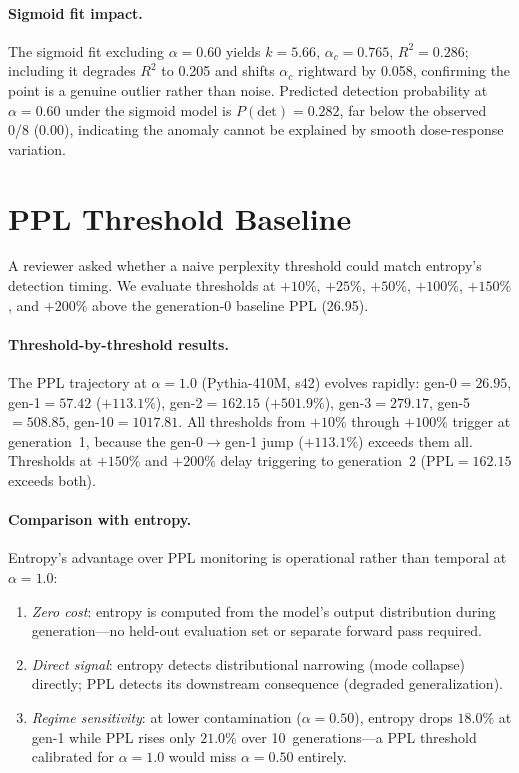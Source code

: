 \paragraph{Sigmoid fit impact.}
The sigmoid fit excluding $\alpha{=}0.60$ yields $k{=}5.66$, $\alpha_c{=}0.765$, $R^2{=}0.286$; including it degrades $R^2$ to 0.205 and shifts $\alpha_c$ rightward by 0.058, confirming the point is a genuine outlier rather than noise.
Predicted detection probability at $\alpha{=}0.60$ under the sigmoid model is $P(\mathrm{det}){=}0.282$, far below the observed 0/8 (0.00), indicating the anomaly cannot be explained by smooth dose-response variation.

\FloatBarrier
\section{PPL Threshold Baseline}
\label{app:ppl_threshold}

A reviewer asked whether a naive perplexity threshold could match entropy's detection timing.
We evaluate thresholds at $+10\%$, $+25\%$, $+50\%$, $+100\%$, $+150\%$, and $+200\%$ above the generation-0 baseline PPL (26.95).

\paragraph{Threshold-by-threshold results.}
The PPL trajectory at $\alpha{=}1.0$ (Pythia-410M, s42) evolves rapidly: gen-0${=}26.95$, gen-1${=}57.42$ ($+113.1\%$), gen-2${=}162.15$ ($+501.9\%$), gen-3${=}279.17$, gen-5${=}508.85$, gen-10${=}1017.81$.
All thresholds from $+10\%$ through $+100\%$ trigger at generation~1, because the gen-0$\to$gen-1 jump ($+113.1\%$) exceeds them all.
Thresholds at $+150\%$ and $+200\%$ delay triggering to generation~2 (PPL${=}162.15$ exceeds both).

\paragraph{Comparison with entropy.}
Entropy's advantage over PPL monitoring is operational rather than temporal at $\alpha{=}1.0$:
\begin{enumerate}
\item \emph{Zero cost}: entropy is computed from the model's output distribution during generation---no held-out evaluation set or separate forward pass required.
\item \emph{Direct signal}: entropy detects distributional narrowing (mode collapse) directly; PPL detects its downstream consequence (degraded generalization).
\item \emph{Regime sensitivity}: at lower contamination ($\alpha{=}0.50$), entropy drops $18.0\%$ at gen-1 while PPL rises only $21.0\%$ over 10~generations---a PPL threshold calibrated for $\alpha{=}1.0$ would miss $\alpha{=}0.50$ entirely.
\end{enumerate}

